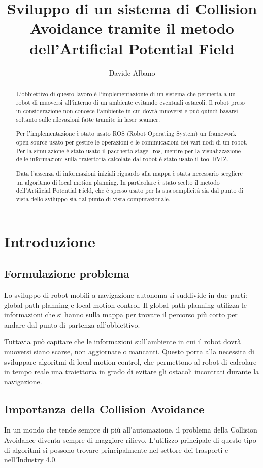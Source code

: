 \documentclass[Lau, binding=0.6cm, oneside]{sapthesis}
\title{Sviluppo di un sistema di Collision Avoidance tramite il metodo dell'Artificial Potential Field}
\author{Davide Albano}
\begin{document}
\maketitle
\begin{abstract}
L'obbiettivo di questo lavoro è l'implementazionie di un sistema che permetta a un robot di muoversi all'interno di un ambiente evitando eventuali ostacoli.
Il robot preso in considerazione non conosce l'ambiente in cui dovrà muoversi e può quindi basarsi soltanto sulle rilevazioni fatte tramite in laser scanner.

Per l'implementazione è stato usato ROS (Robot Operating System) un framework open source usato per gestire le operazioni e le cominucazioni dei vari nodi di un robot.
Per la simulazione è stato usato il pacchetto stage\_ros, mentre per la visualizzazione delle informazioni sulla traiettoria calcolate dal robot è stato usato il tool RVIZ.

Data l'assenza di informazioni iniziali riguardo alla mappa è stata necessario scegliere un algoritmo di local motion planning.
In particolare è stato scelto il metodo dell'Artificial Potential Field, che è spesso usato per la sua semplicità sia dal punto di vista dello sviluppo sia dal punto di vista computazionale.
\end{abstract}
\tableofcontents

\chapter{Introduzione}
\section{Formulazione problema}
Lo sviluppo di robot mobili a navigazione autonoma si suddivide in due parti: global path planning e local motion control.
Il global path planning utilizza le informazioni che si hanno sulla mappa per trovare il percorso più corto per andare dal punto di partenza all'obbiettivo.

Tuttavia può capitare che le informazioni sull'ambiente in cui il robot dovrà muoversi siano scarse, non aggiornate o mancanti.
Questo porta alla necessita di sviluppare algoritmi di local motion control, che permettono al robot di calcolare in tempo reale una traiettoria in grado di evitare gli ostacoli incontrati durante la navigazione.
\cite{fonte1}

\section{Importanza della Collision Avoidance}
In un mondo che tende sempre di più all'automazione, il problema della Collision Avoidance diventa sempre di maggiore rilievo.
L'utilizzo principale di questo tipo di algoritmi si possono trovare principalmente nel settore dei trasporti e nell'Industry 4.0.
\end{document}

